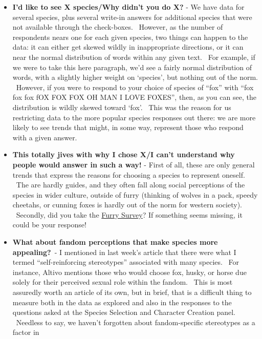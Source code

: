 \begin{itemize}
\tightlist
\item
  \textbf{I'd like to see X species/Why didn't you do X?} - We have data
  for several species, plus several write-in answers for additional
  species that were not available through the check-boxes. ~However, as
  the number of respondents nears one for each given species, two things
  can happen to the data: it can either get skewed wildly in
  inappropriate directions, or it can near the normal distribution of
  words within any given text. ~For example, if we were to take this
  here paragraph, we'd see a fairly normal distribution of words, with a
  slightly higher weight on `species', but nothing out of the norm.
  ~However, if you were to respond to your choice of species of ``fox''
  with ``fox fox fox fOX FOX FOX OH MAN I LOVE FOXES'', then, as you can
  see, the distribution is wildly skewed toward `fox'. ~This was the
  reason for us restricting data to the more popular species responses
  out there: we are more likely to see trends that might, in some way,
  represent those who respond with a given answer.\\
\item
  \textbf{This totally jives with why I chose X/I can't understand why
  people would answer in such a way!} - First of all, these are only
  general trends that express the reasons for choosing a species to
  represent oneself. ~The are hardly guides, and they often fall along
  social perceptions of the species in wider culture, outside of furry
  (thinking of wolves in a pack, speedy cheetahs, or cunning foxes is
  hardly out of the norm for western society). ~Secondly, did you take
  the \href{http://furrypoll.com}{Furry Survey}? If something seems
  missing, it could be your response!\\
\item
  \textbf{What about fandom perceptions that make species more
  appealing?}~- I mentioned in last week's article that there were what
  I termed ``self-reinforcing stereotypes'' associated with many
  species. ~For instance, Altivo mentions those who would choose fox,
  husky, or horse due solely for their perceived sexual role within the
  fandom. ~This is most assuredly worth an article of its own, but in
  brief, that is a difficult thing to measure both in the data as
  explored and also in the responses to the questions asked at the
  Species Selection and Character Creation panel. ~Needless to say, we
  haven't forgotten about fandom-specific stereotypes as a factor in

\end{itemize}
